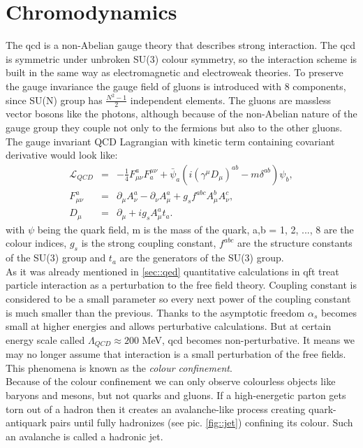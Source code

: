 \section{Chromodynamics}
The \gls{qcd} is a non-Abelian gauge theory that describes strong interaction. The \gls{qcd} is symmetric under unbroken SU(3) colour symmetry, so the interaction scheme is built in the same way as electromagnetic and electroweak theories. To preserve the gauge invariance the gauge field of gluons is introduced with 8 components, since SU(N) group has $\frac{N^2-1}{2}$ independent elements. The gluons are massless vector bosons like the photons, although because of the non-Abelian nature of the gauge group they couple not only to the fermions but also to the other gluons. The gauge invariant QCD Lagrangian with kinetic term containing covariant derivative would look like:
\begin{equation}
\begin{array}{lll} 
	\mathcal{L}_{QCD} &=& -\frac{1}{4}F^a_{\mu\nu}F_a^{\mu\nu} + \bar\psi_a(i(\gamma^{\mu}D_{\mu})^{ab} - m\delta^{ab})\psi_b,\\
	F^a_{\mu\nu}  &=& \partial_{\mu}A_{\nu}^a-\partial_{\nu}A^a_{\mu}+g_sf^{abc}A^b_{\mu}A^c_{\nu},\\
	D_{\mu} &=& \partial_{\mu} + ig_s A_{\mu}^at_a.
\end{array} 
\end{equation}
with $\psi$ being the quark field, m is the mass of the quark, a,b = 1, 2, ..., 8 are the colour indices, $g_s$ is the strong coupling constant, $f^{abc}$ are the structure constants of the SU(3) group and $t_a$ are the generators of the SU(3) group. \\
As it was already mentioned in \ref{sec::qed} quantitative calculations in \gls{qft} treat particle interaction as a perturbation to the free field theory. Coupling constant is considered to be a small parameter so every next power of the coupling constant is much smaller than the previous. Thanks to the asymptotic freedom $\alpha_s$ becomes small at higher energies and allows perturbative calculations. But at certain energy scale called $\Lambda_{QCD}\approx200$ MeV, \gls{qcd} becomes non-perturbative. It means we may no longer assume that interaction is a small perturbation of the free fields. This phenomena is known as the \textit{colour confinement}.\\
Because of the colour confinement we can only observe colourless objects like baryons and mesons, but not quarks and gluons. If a high-energetic parton gets torn out of a hadron then it creates an avalanche-like process creating quark-antiquark pairs until fully hadronizes (see pic. \ref{fig::jet}) confining its colour. Such an avalanche is called a hadronic jet. \\

